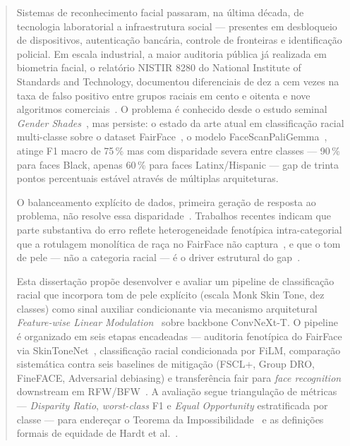 \begin{abstract}
\noindent Sistemas de reconhecimento facial passaram, na última década, de tecnologia laboratorial a infraestrutura social --- presentes em desbloqueio de dispositivos, autenticação bancária, controle de fronteiras e identificação policial. Em escala industrial, a maior auditoria pública já realizada em biometria facial, o relatório NISTIR 8280 do National Institute of Standards and Technology, documentou diferenciais de dez a cem vezes na taxa de falso positivo entre grupos raciais em cento e oitenta e nove algoritmos comerciais~\autocite{grother2019face}. O problema é conhecido desde o estudo seminal \emph{Gender Shades}~\autocite{buolamwini2018gender}, mas persiste: o estado da arte atual em classificação racial multi-classe sobre o dataset FairFace~\autocite{karkkainen2021fairface}, o modelo FaceScanPaliGemma~\autocite{aldahoul2024exploring}, atinge F1 macro de 75\,\% mas com disparidade severa entre classes --- 90\,\% para faces Black, apenas 60\,\% para faces Latinx/Hispanic --- gap de trinta pontos percentuais estável através de múltiplas arquiteturas.

\noindent O balanceamento explícito de dados, primeira geração de resposta ao problema, não resolve essa disparidade~\autocite{kolla2022impact,wang2019racial}. Trabalhos recentes indicam que parte substantiva do erro reflete heterogeneidade fenotípica intra-categorial que a rotulagem monolítica de raça no FairFace não captura~\autocite{telles2014pigmentocrac,bryc2015genetic,lopez2017hispanic}, e que o tom de pele --- não a categoria racial --- é o driver estrutural do gap~\autocite{pangelinan2023exploring,matias2026large}.

\noindent Esta dissertação propõe desenvolver e avaliar um pipeline de classificação racial que incorpora tom de pele explícito (escala Monk Skin Tone, dez classes) como sinal auxiliar condicionante via mecanismo arquitetural \emph{Feature-wise Linear Modulation}~\autocite{perez2018film} sobre backbone ConvNeXt-T. O pipeline é organizado em seis etapas encadeadas --- auditoria fenotípica do FairFace via SkinToneNet~\autocite{matias2026large}, classificação racial condicionada por FiLM, comparação sistemática contra seis baselines de mitigação (FSCL+, Group DRO, FineFACE, Adversarial debiasing) e transferência fair para \emph{face recognition} downstream em RFW/BFW~\autocite{wang2019racial,robinson2020face}. A avaliação segue triangulação de métricas --- \emph{Disparity Ratio}, \emph{worst-class} F1 e \emph{Equal Opportunity} estratificada por classe --- para endereçar o Teorema da Impossibilidade~\autocite{kleinberg2017inherent} e as definições formais de equidade de Hardt et al.~\autocite{hardt2016equality}.


\end{abstract}
